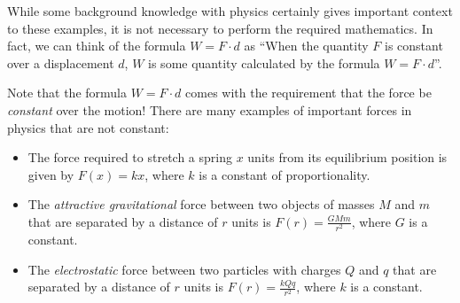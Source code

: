 \documentclass{ximera}
\begin{document}
\begin{remark}
While some background knowledge with physics certainly gives important context to these examples, it is not necessary to perform the required mathematics.  In fact, we can think of the formula $W=F\cdot d$ as ``When the quantity $F$ is constant over a displacement $d$,  $W$ is some quantity calculated by the formula $W=F \cdot d$''.
\end{remark}

\begin{remark}
Note that the formula $W=F \cdot d$ comes with the requirement that the force be \emph{constant} over the motion!  There are many examples of important forces in physics that are not constant:

\begin{itemize}
\item The force required to stretch a spring $x$ units from its equilibrium position is given by $F(x) = k x$, where $k$ is a constant of proportionality.
\item The \emph{attractive gravitational} force between two objects of masses $M$ and $m$ that are separated by a distance of $r$ units  is $F(r) = \frac{GMm}{r^2}$, where $G$ is a constant.  
\item The \emph{electrostatic} force between two particles with charges $Q$ and $q$ that are separated by a distance of $r$ units  is $F(r) = \frac{kQq}{r^2}$, where $k$ is a constant.
\end{itemize}
\end{remark}
\end{document}
